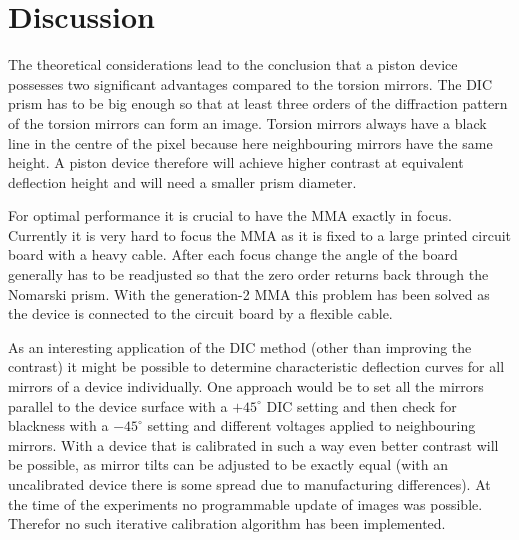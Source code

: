 \section{Discussion}
The theoretical considerations lead to the conclusion that a piston
device possesses two significant advantages compared to the torsion
mirrors. The DIC prism has to be big enough so that at least three
orders of the diffraction pattern of the torsion mirrors can form an
image. Torsion mirrors always have a black line in the centre of the
pixel because here neighbouring mirrors have the same height. A piston
device therefore will achieve higher contrast at equivalent deflection
height and will need a smaller prism diameter.

For optimal performance it is crucial to have the MMA exactly in
focus. Currently it is very hard to focus the MMA as it is fixed to a
large printed circuit board with a heavy cable. After each focus
change the angle of the board generally has to be readjusted so that
the zero order returns back through the Nomarski prism. With the
generation-2 MMA this problem has been solved as the device is
connected to the circuit board by a flexible cable.

As an interesting application of the DIC method (other than improving
the contrast) it might be possible to determine characteristic
deflection curves for all mirrors of a device individually. One
approach would be to set all the mirrors parallel to the device
surface with a $+45^\circ$ DIC setting and then check for blackness
with a $-45^\circ$ setting and different voltages applied to
neighbouring mirrors. With a device that is calibrated in such a way
even better contrast will be possible, as mirror tilts can be adjusted
to be exactly equal (with an uncalibrated device there is some spread
due to manufacturing differences). At the time of the experiments no
programmable update of images was possible. Therefor no such iterative
calibration algorithm has been implemented.
